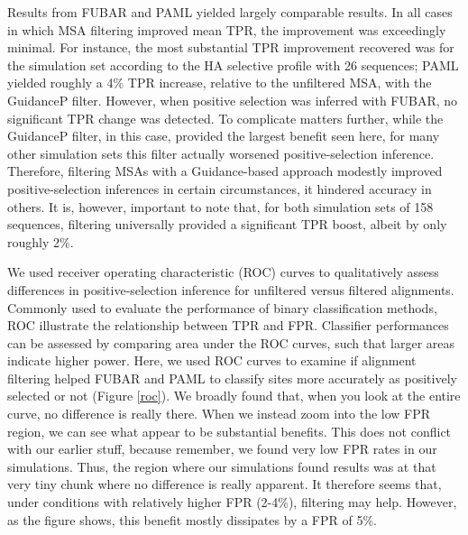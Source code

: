 \documentclass[11pt]{article}
\begin{document}
Results from FUBAR and PAML yielded largely comparable results. In all cases in which MSA filtering improved mean TPR, the improvement was exceedingly minimal. For instance, the most substantial TPR improvement recovered was for the simulation set according to the HA selective profile with 26 sequences; PAML yielded roughly a 4\% TPR increase, relative to the unfiltered MSA, with the GuidanceP filter. However, when positive selection was inferred with FUBAR, no significant TPR change was detected. To complicate matters further, while the GuidanceP filter, in this case, provided the largest benefit seen here, for many other simulation sets this filter actually worsened positive-selection inference. Therefore, filtering MSAs with a Guidance-based approach modestly improved positive-selection inferences in certain circumstances, it hindered accuracy in others. It is, however, important to note that, for both simulation sets of 158 sequences, filtering universally provided a significant TPR boost, albeit by only roughly 2\%.

We used receiver operating characteristic (ROC) curves to qualitatively assess differences in positive-selection inference for unfiltered versus filtered alignments. Commonly used to evaluate the performance of binary classification methods, ROC illustrate the relationship between TPR and FPR. Classifier performances can be assessed by comparing area under the ROC curves, such that larger areas indicate higher power. Here, we used ROC curves to examine if alignment filtering helped FUBAR and PAML to classify sites more accurately as positively selected or not (Figure \ref{roc}). We broadly found that, when you look at the entire curve, no difference is really there. When we instead zoom into the low FPR region, we can see what appear to be substantial benefits. This does not conflict with our earlier stuff, because remember, we found very low FPR rates in our simulations. Thus, the region where our simulations found results was at that very tiny chunk where no difference is really apparent. It therefore seems that, under conditions with relatively higher FPR (2-4\%), filtering may help. However, as the figure shows, this benefit mostly dissipates by a FPR of 5\%. 
\end{document}
